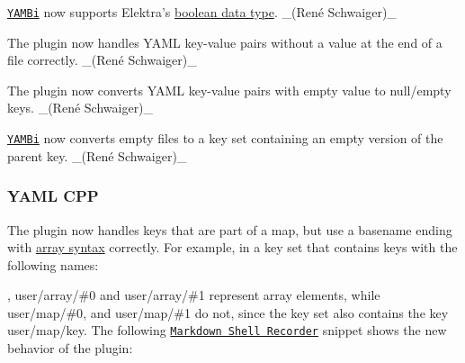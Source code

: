 \begin{DoxyItemize}
\item \href{https://www.libelektra.org/plugins/yambi}{\tt Y\+A\+M\+Bi} now supports Elektra’s \hyperlink{doc_decisions_bool_md}{boolean data type}. \+\_\+(René Schwaiger)\+\_\+
\item The plugin now handles Y\+A\+ML key-\/value pairs without a value at the end of a file correctly. \+\_\+(René Schwaiger)\+\_\+
\item The plugin now converts Y\+A\+ML key-\/value pairs with empty value to null/empty keys. \+\_\+(René Schwaiger)\+\_\+
\item \href{https://www.libelektra.org/plugins/yambi}{\tt Y\+A\+M\+Bi} now converts empty files to a key set containing an empty version of the parent key. \+\_\+(René Schwaiger)\+\_\+
\end{DoxyItemize}

\subsubsection*{Y\+A\+ML C\+PP}


\begin{DoxyItemize}
\item The plugin now handles keys that are part of a map, but use a basename ending with \hyperlink{doc_tutorials_arrays_md}{array syntax} correctly. For example, in a key set that contains keys with the following names\+:
\end{DoxyItemize}




, {\ttfamily user/array/\#0} and {\ttfamily user/array/\#1} represent array elements, while {\ttfamily user/map/\#0}, and {\ttfamily user/map/\#1} do not, since the key set also contains the key {\ttfamily user/map/key}. The following \href{https://master.libelektra.org/tests/shell/shell_recorder/tutorial_wrapper}{\tt Markdown Shell Recorder} snippet shows the new behavior of the plugin\+:




